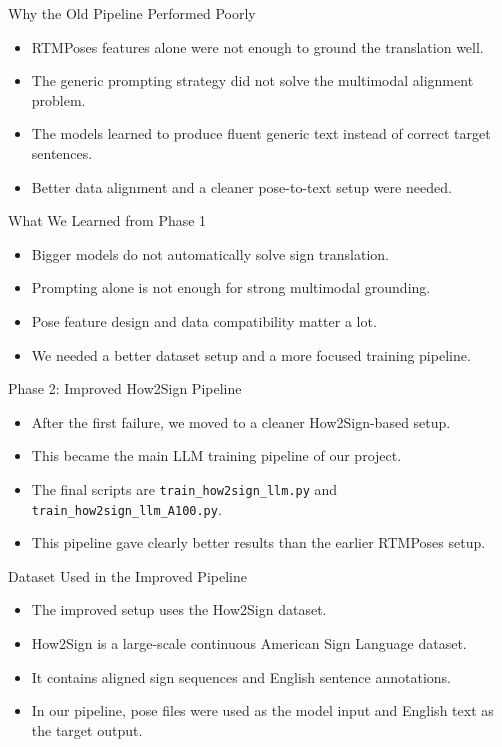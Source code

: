 \documentclass[aspectratio=169]{beamer}
\begin{document}
\begin{frame}{Why the Old Pipeline Performed Poorly}
\begin{itemize}
  \item RTMPoses features alone were not enough to ground the translation well.
  \item The generic prompting strategy did not solve the multimodal alignment problem.
  \item The models learned to produce fluent generic text instead of correct target sentences.
  \item Better data alignment and a cleaner pose-to-text setup were needed.
\end{itemize}
\end{frame}

\begin{frame}{What We Learned from Phase 1}
\begin{itemize}
  \item Bigger models do not automatically solve sign translation.
  \item Prompting alone is not enough for strong multimodal grounding.
  \item Pose feature design and data compatibility matter a lot.
  \item We needed a better dataset setup and a more focused training pipeline.
\end{itemize}
\end{frame}

\begin{frame}{Phase 2: Improved How2Sign Pipeline}
\begin{itemize}
  \item After the first failure, we moved to a cleaner How2Sign-based setup.
  \item This became the main LLM training pipeline of our project.
  \item The final scripts are \texttt{train\_how2sign\_llm.py} and \texttt{train\_how2sign\_llm\_A100.py}.
  \item This pipeline gave clearly better results than the earlier RTMPoses setup.
\end{itemize}
\end{frame}

\begin{frame}{Dataset Used in the Improved Pipeline}
\begin{itemize}
  \item The improved setup uses the How2Sign dataset.
  \item How2Sign is a large-scale continuous American Sign Language dataset.
  \item It contains aligned sign sequences and English sentence annotations.
  \item In our pipeline, pose files were used as the model input and English text as the target output.
\end{itemize}
\end{frame}
\end{document}

